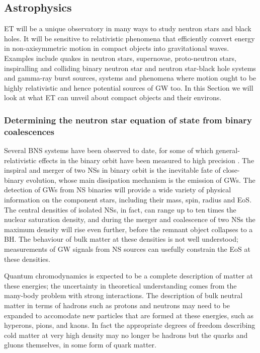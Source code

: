 \clearpage
\FloatBarrier

\subsection{Astrophysics}
ET will be a unique observatory in many ways to study neutron stars 
and black holes.  It will be sensitive to relativistic phenomena that 
efficiently convert energy in non-axisymmetric motion in compact
objects into gravitational waves. Examples include quakes in neutron 
stars, supernovae, proto-neutron stars, inspiralling and colliding 
binary neutron star and neutron star-black hole systems and gamma-ray 
burst sources, systems and phenomena where motion ought to be 
highly relativistic and hence potential sources of GW too.
In this Section we will look at what ET can unveil about compact 
objects and their environs.

\subsubsection{Determining the neutron star equation of state from 
binary coalescences}


Several BNS systems have been observed to date, for some of which
general-relativistic effects in the binary orbit have been measured 
to high precision \cite{Living:Lorimer}. The inspiral and merger of 
two NSs in binary orbit is the inevitable fate of close-binary
evolution, whose main dissipation mechanism is the emission of
GWs.  The detection of GWs from
NS binaries will provide a wide variety of physical
information on the component stars, including their mass, spin, radius
and EoS.  The central densities of isolated
NSs, in fact, can range up to ten times the nuclear saturation
density, and during the merger and coalescence of two NSs
the maximum density will rise even further, before the remnant object
collapses to a BH.  The behaviour of bulk matter at these
densities is not well understood; measurements of GW
signals from NS sources can usefully constrain the
EoS at these densities.

Quantum chromodynamics is expected to be a complete description of matter
at these energies; the uncertainty in theoretical understanding comes from
the many-body problem with strong interactions. The description of bulk
neutral matter in terms of hadrons such as protons and neutrons may need to
be expanded to accomodate new particles that are formed at these energies,
such as hyperons, pions, and kaons. In fact the appropriate degrees of
freedom describing cold matter at very high density may no longer be
hadrons but the quarks and gluons themselves, in some form of quark matter.

